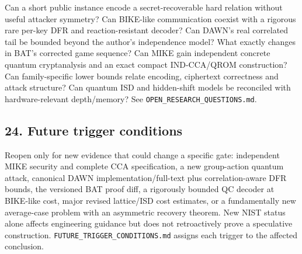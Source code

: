 \documentclass[
  10pt,
  a4paper,
]{article}
\begin{document}
Can a short public instance encode a secret-recoverable hard relation
without useful attacker symmetry? Can BIKE-like communication coexist
with a rigorous rare per-key DFR and reaction-resistant decoder? Can
DAWN's real correlated tail be bounded beyond the author's independence
model? What exactly changes in BAT's corrected game sequence? Can MIKE
gain independent concrete quantum cryptanalysis and an exact compact
IND-CCA/QROM construction? Can family-specific lower bounds relate
encoding, ciphertext correctness and attack structure? Can quantum ISD
and hidden-shift models be reconciled with hardware-relevant
depth/memory? See \texttt{OPEN\_RESEARCH\_QUESTIONS.md}.

\hypertarget{future-trigger-conditions}{%
\subsection{24. Future trigger
conditions}\label{future-trigger-conditions}}

Reopen only for new evidence that could change a specific gate:
independent MIKE security and complete CCA specification, a new
group-action quantum attack, canonical DAWN implementation/full-text
plus correlation-aware DFR bounds, the versioned BAT proof diff, a
rigorously bounded QC decoder at BIKE-like cost, major revised
lattice/ISD cost estimates, or a fundamentally new average-case problem
with an asymmetric recovery theorem. New NIST status alone affects
engineering guidance but does not retroactively prove a speculative
construction. \texttt{FUTURE\_TRIGGER\_CONDITIONS.md} assigns each
trigger to the affected conclusion.
\end{document}
